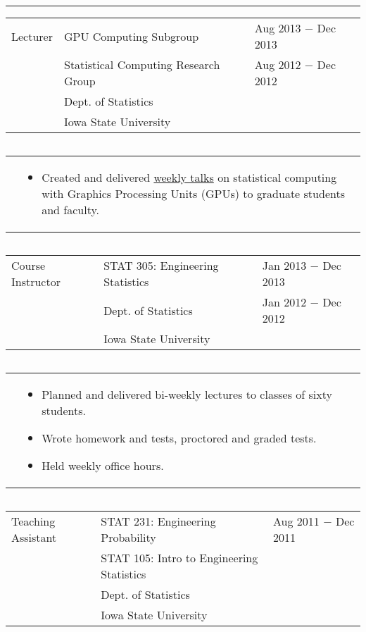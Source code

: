 \documentclass{article}
\newcommand{\q}{$\quad$ \newline}
\newcommand{\vl}{4.25}
\newcommand{\wl}{8.4}
\newcommand{\ww}{13}
\newcommand{\myrule}{\noindent \rule{\textwidth}{1pt}}
\begin{document}


\myrule
 
\noindent \begin{tabular}{@{}p{\vl cm}p{\wl cm}l@{}}
Lecturer & GPU Computing Subgroup & Aug 2013 $-$ Dec 2013 \\
& Statistical Computing Research Group & Aug 2012 $-$ Dec 2012 \\
& Dept. of Statistics & \\
& Iowa State University & 
\end{tabular} \q 
   
 \noindent \begin{tabular}{@{}p{\vl cm}p{\ww cm}@{}}
& \begin{itemize}
\item Created and delivered \href{http://will-landau.com/gpu}{weekly talks} on statistical computing with Graphics Processing Units (GPUs) to graduate students and faculty.
\end{itemize}
\end{tabular} \q 


\noindent \begin{tabular}{@{}p{\vl cm}p{\wl cm}l@{}}
Course Instructor & STAT 305: Engineering Statistics & Jan 2013 $-$ Dec 2013 \\
& Dept. of Statistics & Jan 2012 $-$ Dec 2012 \\
& Iowa State University & \\
\end{tabular} \q 

\noindent \begin{tabular}{@{}p{\vl cm}p{\ww cm}@{}}
& \begin{itemize}
\item Planned and delivered bi-weekly lectures to classes of sixty students. 
\item Wrote homework and tests, proctored and graded tests. 
\item Held weekly office hours. 
\end{itemize}
\end{tabular} \q  

\noindent \begin{tabular}{@{}p{\vl cm}p{\wl cm}l@{}}
Teaching Assistant & STAT 231: Engineering Probability & Aug 2011 $-$ Dec 2011 \\
& STAT 105: Intro to Engineering Statistics & \\
& Dept. of Statistics & \\
& Iowa State University & \\
\end{tabular} \q 
\end{document}
